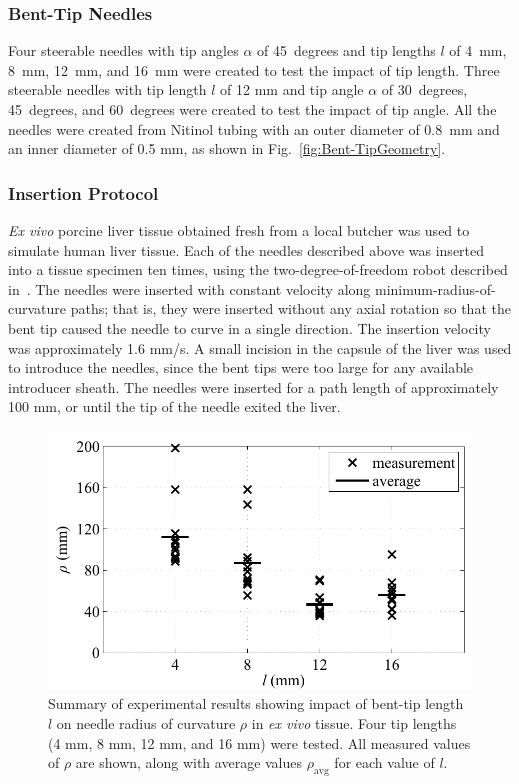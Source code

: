 \subsubsection{Bent-Tip Needles}
Four steerable needles with tip angles $\alpha$ of 45~degrees and tip lengths $l$ of 4~mm, 8~mm, 12~mm, and 16~mm were created to test the impact of tip length. Three steerable needles with tip length $l$ of 12 mm and tip angle $\alpha$ of 30~degrees, 45~degrees, and 60~degrees were created to test the impact of tip angle. All the needles were created from Nitinol tubing with an outer diameter of 0.8~mm and an inner diameter of 0.5 mm, as shown in Fig.~\ref{fig:Bent-TipGeometry}.

\subsubsection{Insertion Protocol}
\textit{Ex vivo} porcine liver tissue obtained fresh from a local butcher was used to simulate human liver tissue. Each of the needles described above was inserted into a tissue specimen ten times, using the two-degree-of-freedom robot described in~\cite{Adebar2014}. The needles were inserted with constant velocity along minimum-radius-of-curvature paths; that is, they were inserted without any axial rotation so that the bent tip caused the needle to curve in a single direction. The insertion velocity was approximately 1.6 mm/s. A small incision in the capsule of the liver was used to introduce the needles, since the bent tips were too large for any available introducer sheath. The needles were inserted for a path length of approximately 100 mm, or until the tip of the needle exited the liver. 

\begin{figure}[!t]
\centering
\includegraphics[width=0.75\columnwidth]{Images/Chapter3/CurvatureVsLength/CurvatureVsLength}%
\caption[Impact of bent-tip length $l$ on needle radius of curvature $\rho$]{Summary of experimental results showing impact of bent-tip length $l$ on needle radius of curvature $\rho$ in \textit{ex vivo} tissue. Four tip lengths (4 mm, 8 mm, 12 mm, and 16 mm) were tested. All measured values of $\rho$ are shown, along with average values $\rho_{\text{avg}}$ for each value of $l$.}
\label{fig:CurvatureVsLength}
\end{figure}


